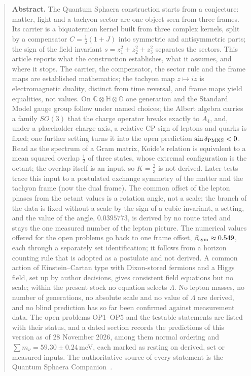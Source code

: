 \begin{quote}
\small
\noindent\textbf{Abstract.}
The Quantum Sphaera construction starts from a conjecture: matter, light and a tachyon sector are one object seen from three
frames. Its carrier is a biquaternion kernel built from three complex kernels, split by a compensator $C=\tfrac12(1+J)$ into
symmetric and antisymmetric parts; the sign of the field invariant $s=z_1^2+z_2^2+z_3^2$ separates the sectors. This article
reports what the construction establishes, what it assumes, and where it stops. The carrier, the compensator, the sector rule
and the frame maps are established mathematics; the tachyon map $z\mapsto iz$ is electromagnetic duality, distinct from time
reversal, and frame maps yield equalities, not values. On $\mathbb C\otimes\mathbb H\otimes\mathbb O$ one generation and the
Standard Model gauge group follow under named choices; the Albert algebra carries a family $SO(3)$ that the charge operator
breaks exactly to $A_4$, and, under a placeholder charge axis, a relative CP sign of leptons and quarks is fixed; one further
setting turns it into the open prediction $\sin\delta_{\rm PMNS}<0$. Read as the spectrum of a Gram matrix, Koide's relation is
equivalent to a mean squared overlap $\tfrac12$ of three states, whose extremal configuration is the octant; the overlap itself is
an input, so $K=\tfrac23$ is not derived. Later tests trace this input to a postulated exchange symmetry of the
matter and the tachyon frame (now the dual frame). The common offset of the lepton phases from the octant values is a rotation
angle, not a scale; the branch of the data is fixed without a scale by the sign of a cubic invariant, a setting, and the value of the
angle, $0.0395773$, is derived by no route tried and stays the one measured number of the lepton picture. The numerical values offered for the open problems go back to one
frame offset, $\beta_{\mathrm{sym}}\approx0.549$, each through a separately set identification; it follows from a horizon counting rule that is adopted as a postulate and not derived. A common action of Einstein--Cartan type with Dixon-stored fermions and a Higgs field, set up by author decisions, gives
consistent field equations but no scale; within the present stock no equation selects $\Lambda$. No lepton masses, no number of
generations, no absolute scale and no value of $\Lambda$ are derived, and no blind prediction has so far been confirmed against
measurement data. The open problems OP1--OP5 and the testable statements are listed with their
status, and a dated section records the predictions of this version as of 28 November 2026, among them normal ordering and
$\sum m_\nu=59.30\pm0.24$\,meV, each marked as resting on derived, set or measured inputs. The authoritative source of every statement is the Quantum Sphaera Companion~\cite{QSC}.
\end{quote}
